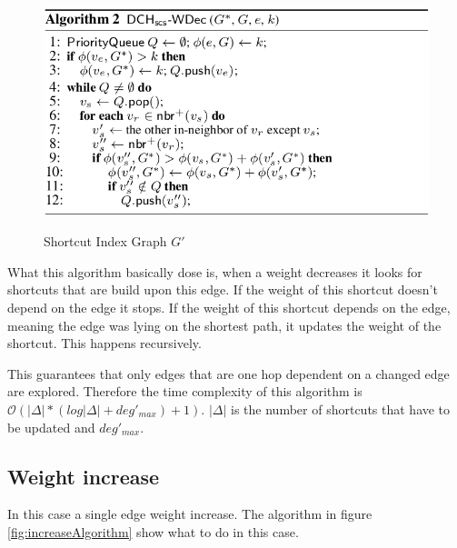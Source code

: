 \documentclass[twocolumn]{article}
\begin{document}
\begin{figure}[ht]
    \caption{Shortcut Index Graph $G'$}
    \centering
    \includegraphics[width=\linewidth]{decreaseAlgorithm}
    \label{fig:decreaseAlgorithm}
\end{figure}

What this algorithm basically dose is, when a weight decreases it looks for shortcuts that are build upon this edge.
If the weight of this shortcut doesn't depend on the edge it stops. If the weight of this shortcut depends on the edge, 
meaning the edge was lying on the shortest path, it updates the weight of the shortcut. This happens recursively.

This guarantees that only edges that are one hop dependent on a changed edge are explored. Therefore the time complexity 
of this algorithm is $\mathcal{O}(\vert\Delta\vert  * (log \vert \Delta \vert + deg'_{max}) + 1)$.  $\vert\Delta\vert$ is the
number of shortcuts that have to be updated and $deg'_{max}$. 

\subsection{Weight increase}
In this case a single edge weight increase. The algorithm in figure \ref{fig:increaseAlgorithm} 
show what to do in this case. 
\end{document}
